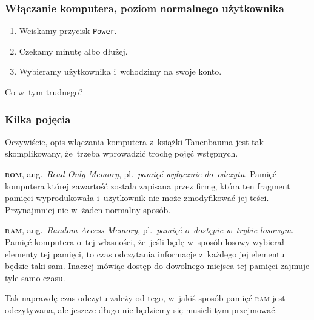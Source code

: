 \documentclass[10pt,t]{beamer}
\begin{document}
\begin{frame}
  \frametitle{Włączanie komputera, poziom normalnego użytkownika}


  \begin{enumerate}

  \item Wciskamy przycisk \texttt{Power}.

  \item Czekamy minutę albo dłużej.

  \item Wybieramy użytkownika i~wchodzimy na swoje konto.

  \end{enumerate}

  Co w~tym trudnego?

\end{frame}





\begin{frame}
  \frametitle{Kilka pojęcia}


  Oczywiście, opis włączania komputera z~książki Tanenbauma jest tak
  skomplikowany, że~trzeba wprowadzić trochę pojęć wstępnych.

  \textbf{\textsc{rom}}, ang.~\textit{Read Only Memory}, pl.~\textit{pamięć
    wyłącznie do~odczytu}. Pamięć komputera której zawartość została
  zapisana przez firmę, która ten fragment pamięci wyprodukowała
  i~użytkownik nie może zmodyfikować jej teści. Przynajmniej nie w~żaden
  normalny sposób.

  \textbf{\textsc{ram}}, ang.~\textit{Random Access Memory},
  pl.~\textit{pamięć o~dostępie w~trybie losowym}. Pamięć komputera o~tej
  własności, że~jeśli będę w~sposób losowy wybierał elementy tej pamięci,
  to czas odczytania informacje z~każdego jej elementu będzie taki sam.
  Inaczej mówiąc dostęp do dowolnego miejsca tej pamięci zajmuje tyle samo
  czasu.

  Tak naprawdę czas odczytu zależy od tego, w~jakiś sposób pamięć
  \textsc{ram} jest odczytywana, ale jeszcze długo nie będziemy się musieli
  tym przejmować.

\end{frame}
\end{document}
